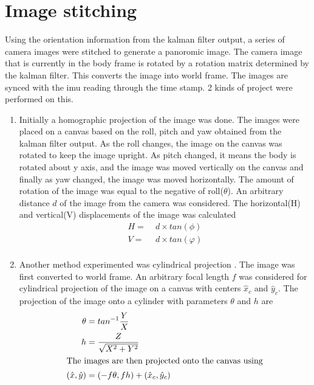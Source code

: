 \documentclass[fleqn,10pt]{SelfArx} %
\begin{document}
\section{Image stitching}
Using the orientation information from the kalman filter output, a series of camera images were stitched to generate a panoromic image. The camera image that is currently in the body frame is rotated by a rotation matrix determined by the kalman filter. This converts the image into world frame. The images are synced with the imu reading through the time stamp. 2 kinds of project were performed on this. 
\begin{enumerate}
\item Initially a homographic projection of the image was done. The images were placed on a canvas based on the roll, pitch and yaw obtained from the kalman filter output. As the roll changes, the image on the canvas was rotated to keep the image upright. As pitch changed, it means the body is rotated about y axis, and the image was moved vertically on the canvas and finally as yaw changed, the image was moved horizontally. The amount of rotation of the image was equal to the negative of roll($\theta$). An arbitrary distance $d$ of the image from the camera was considered. The horizontal(H) and vertical(V) displacements of the image was calculated
\begin{align*}
H =&\; d \times tan(\phi) \\
V =&\; d \times tan(\varphi) \\
\end{align*}
\vspace{-1cm}
\item Another method experimented was cylindrical projection \cite{cyc}. The image was first converted to world frame. An arbitrary focal length $f$ was considered for cylindrical projection of the image on a canvas with centers $\hat{x}_c$ and $\hat{y}_c$. The projection of the image onto a cylinder with parameters $\theta$ and $h$ are
\begin{align*}
\theta =&\; tan^{-1}\frac{Y}{X} \\
h =&\; \frac{Z}{\sqrt{X^2+Y^2}} \\
\intertext{The images are then projected onto the canvas using}
(\hat{x},\hat{y}) =&\; (-f\theta,fh) + (\hat{x}_c,\hat{y}_c)
\end{align*}
\end{enumerate}
\end{document}
